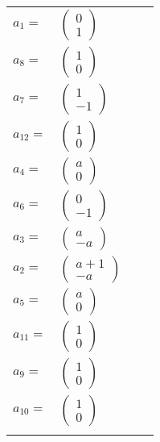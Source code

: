 \documentclass[1p]{elsarticle_modified}
\theoremstyle{definition}
\begin{document}
\begin{tabular}{m{7pt} m{180pt} m{7pt} m{180pt} }
\flushright $a_{1}=$&$\begin{pmatrix}0\\1\end{pmatrix}$ \\
\flushright $a_{8}=$&$\begin{pmatrix}1\\0\end{pmatrix}$ \\
\flushright $a_{7}=$&$\begin{pmatrix}1\\-1\end{pmatrix}$ \\
\flushright $a_{12}=$&$\begin{pmatrix}1\\0\end{pmatrix}$ \\
\flushright $a_{4}=$&$\begin{pmatrix}a\\0\end{pmatrix}$ \\
\flushright $a_{6}=$&$\begin{pmatrix}0\\-1\end{pmatrix}$ \\
\flushright $a_{3}=$&$\begin{pmatrix}a\\- a\end{pmatrix}$ \\
\flushright $a_{2}=$&$\begin{pmatrix}a+1\\- a\end{pmatrix}$ \\
\flushright $a_{5}=$&$\begin{pmatrix}a\\0\end{pmatrix}$ \\
\flushright $a_{11}=$&$\begin{pmatrix}1\\0\end{pmatrix}$ \\
\flushright $a_{9}=$&$\begin{pmatrix}1\\0\end{pmatrix}$ \\
\flushright $a_{10}=$&$\begin{pmatrix}1\\0\end{pmatrix}$\\&\end{tabular}
\end{document}
